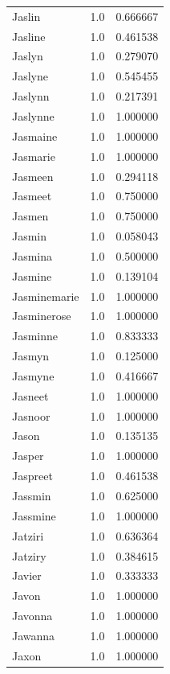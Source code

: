 \documentclass[
  letterpaper,
  DIV=11,
  numbers=noendperiod]{scrreprt}
\begin{document}
\begin{tabular}{lrr}
Jaslin          &   1.0 &   0.666667 \\
Jasline         &   1.0 &   0.461538 \\
Jaslyn          &   1.0 &   0.279070 \\
Jaslyne         &   1.0 &   0.545455 \\
Jaslynn         &   1.0 &   0.217391 \\
Jaslynne        &   1.0 &   1.000000 \\
Jasmaine        &   1.0 &   1.000000 \\
Jasmarie        &   1.0 &   1.000000 \\
Jasmeen         &   1.0 &   0.294118 \\
Jasmeet         &   1.0 &   0.750000 \\
Jasmen          &   1.0 &   0.750000 \\
Jasmin          &   1.0 &   0.058043 \\
Jasmina         &   1.0 &   0.500000 \\
Jasmine         &   1.0 &   0.139104 \\
Jasminemarie    &   1.0 &   1.000000 \\
Jasminerose     &   1.0 &   1.000000 \\
Jasminne        &   1.0 &   0.833333 \\
Jasmyn          &   1.0 &   0.125000 \\
Jasmyne         &   1.0 &   0.416667 \\
Jasneet         &   1.0 &   1.000000 \\
Jasnoor         &   1.0 &   1.000000 \\
Jason           &   1.0 &   0.135135 \\
Jasper          &   1.0 &   1.000000 \\
Jaspreet        &   1.0 &   0.461538 \\
Jassmin         &   1.0 &   0.625000 \\
Jassmine        &   1.0 &   1.000000 \\
Jatziri         &   1.0 &   0.636364 \\
Jatziry         &   1.0 &   0.384615 \\
Javier          &   1.0 &   0.333333 \\
Javon           &   1.0 &   1.000000 \\
Javonna         &   1.0 &   1.000000 \\
Jawanna         &   1.0 &   1.000000 \\
Jaxon           &   1.0 &   1.000000 \\

\end{tabular}
\end{document}
